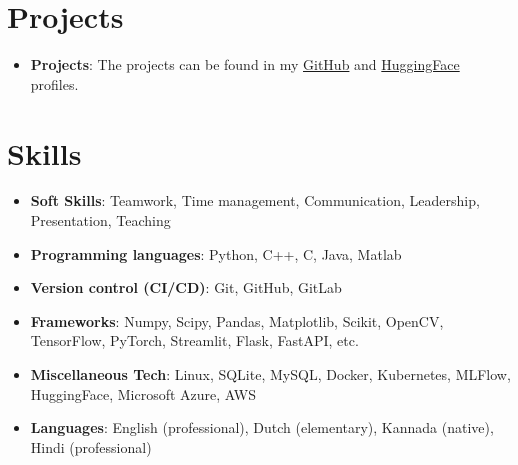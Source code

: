 \documentclass[letterpaper, 10pt]{article}
\newcommand{\resumeItem}[2]{
    \item\small{
        \textbf{#1}{: #2 \vspace{-2pt}}
    }
}
\newcommand{\resumeSubItem}[2]{\resumeItem{#1}{#2}\vspace{-4pt}}
\newcommand{\resumeSubHeadingListStart}{\begin{itemize}[leftmargin=*]}
\newcommand{\resumeSubHeadingListEnd}{\end{itemize}\vspace{-5pt}}
\begin{document}

\section{Projects}
    \resumeSubHeadingListStart
        \resumeSubItem{Projects}
        {The projects can be found in my \href{https://github.com/AbhishekRS4/}{GitHub} and \href{https://huggingface.co/abhishekrs4}{HuggingFace} profiles.}
    \resumeSubHeadingListEnd

\section{Skills}
    \resumeSubHeadingListStart
        \resumeSubItem{Soft Skills}
        {Teamwork, Time management, Communication, Leadership, Presentation, Teaching}
        \resumeSubItem{Programming languages}
        {Python, C++, C, Java, Matlab}
        \resumeSubItem{Version control (CI/CD)}
        {Git, GitHub, GitLab}
        \resumeSubItem{Frameworks}
        {Numpy, Scipy, Pandas, Matplotlib, Scikit, OpenCV, TensorFlow, PyTorch, Streamlit, Flask, FastAPI, etc.}
        \resumeSubItem{Miscellaneous Tech}
        {Linux, SQLite, MySQL, Docker, Kubernetes, MLFlow, HuggingFace, Microsoft Azure, AWS}
        \resumeSubItem{Languages}
        {English (professional), Dutch (elementary), Kannada (native), Hindi (professional)}
    \resumeSubHeadingListEnd
\end{document}

